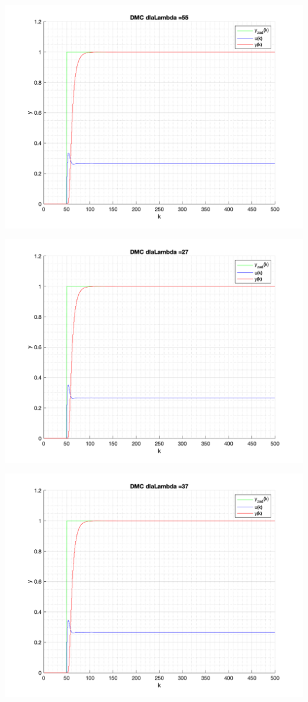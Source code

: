\documentclass[a4paper, 11pt]{article}
\begin{document}
\begin{enumerate}
 \includegraphics[width=\linewidth]{./ModelsP4_Lambda/P4_DMC_Lambda_55_png.png} 
 
 \includegraphics[width=\linewidth]{./ModelsP4_Lambda/P4_DMC_Lambda_27_png.png} 
 
 \includegraphics[width=\linewidth]{./ModelsP4_Lambda/P4_DMC_Lambda_37_png.png} 
 

\end{enumerate}
\end{document}
